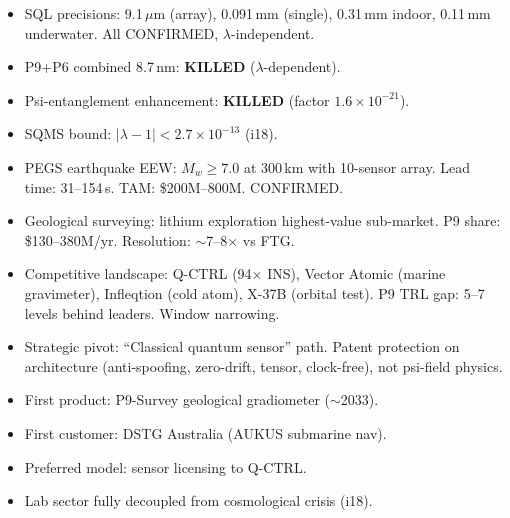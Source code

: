 \documentclass[11pt]{article}
\theoremstyle{definition}
\theoremstyle{remark}
\newcommand{\ee}[1]{\times10^{#1}}
\begin{document}
\begin{tcolorbox}[colback=gray!5!white, colframe=gray!70!black,
  title=\textbf{INHERITED STATE FOR NEXT ITERATION}]
\begin{itemize}
  \item SQL precisions: 9.1\,$\mu$m (array), 0.091\,mm (single), 0.31\,mm
    indoor, 0.11\,mm underwater. All CONFIRMED, $\lambda$-independent.
  \item P9+P6 combined 8.7\,nm: \textbf{KILLED} ($\lambda$-dependent).
  \item Psi-entanglement enhancement: \textbf{KILLED} (factor $1.6\ee{-21}$).
  \item SQMS bound: $|\lambda - 1| < 2.7\ee{-13}$ (i18).
  \item PEGS earthquake EEW: $M_w \geq 7.0$ at 300\,km with 10-sensor array.
    Lead time: 31--154\,s. TAM: \$200M--800M. CONFIRMED.
  \item Geological surveying: lithium exploration highest-value sub-market.
    P9 share: \$130--380M/yr. Resolution: $\sim$7--8$\times$ vs FTG.
  \item Competitive landscape: Q-CTRL (94$\times$ INS), Vector Atomic
    (marine gravimeter), Infleqtion (cold atom), X-37B (orbital test).
    P9 TRL gap: 5--7 levels behind leaders. Window narrowing.
  \item Strategic pivot: ``Classical quantum sensor'' path. Patent protection
    on architecture (anti-spoofing, zero-drift, tensor, clock-free), not
    psi-field physics.
  \item First product: P9-Survey geological gradiometer ($\sim$2033).
  \item First customer: DSTG Australia (AUKUS submarine nav).
  \item Preferred model: sensor licensing to Q-CTRL.
  \item Lab sector fully decoupled from cosmological crisis (i18).
\end{itemize}
\end{tcolorbox}
\end{document}

